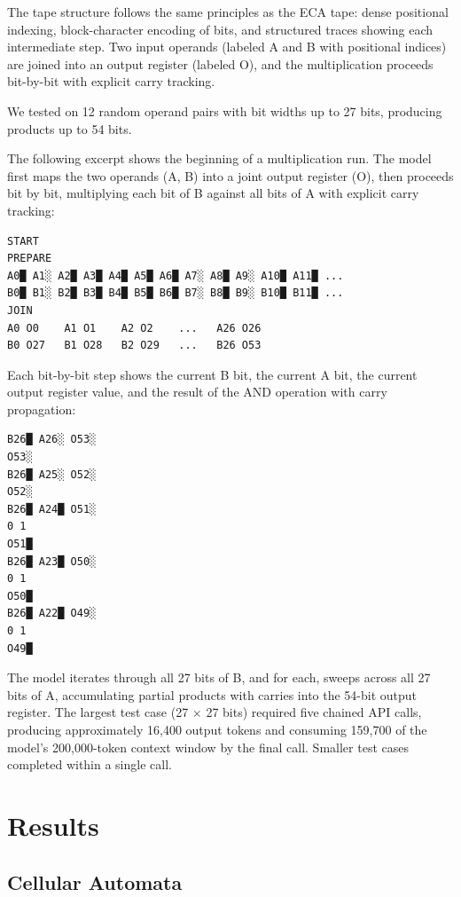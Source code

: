 \documentclass[twocolumn,switch,10pt]{article}
\begin{document}
The tape structure follows the same principles as the ECA tape: dense positional indexing, block-character encoding of bits, and structured traces showing each intermediate step. Two input operands (labeled A and B with positional indices) are joined into an output register (labeled O), and the multiplication proceeds bit-by-bit with explicit carry tracking.

We tested on 12 random operand pairs with bit widths up to 27 bits, producing products up to 54 bits.

The following excerpt shows the beginning of a multiplication run. The model first maps the two operands (A, B) into a joint output register (O), then proceeds bit by bit, multiplying each bit of B against all bits of A with explicit carry tracking:

\begin{verbatim}
START
PREPARE
A0█ A1░ A2█ A3█ A4█ A5█ A6█ A7░ A8█ A9░ A10█ A11█ ...
B0█ B1░ B2█ B3█ B4█ B5█ B6█ B7░ B8█ B9░ B10█ B11█ ...
JOIN
A0 O0    A1 O1    A2 O2    ...   A26 O26
B0 O27   B1 O28   B2 O29   ...   B26 O53
\end{verbatim}

Each bit-by-bit step shows the current B bit, the current A bit, the current output register value, and the result of the AND operation with carry propagation:

\begin{verbatim}
B26█ A26░ O53░
O53░
B26█ A25░ O52░
O52░
B26█ A24█ O51░
0 1
O51█
B26█ A23█ O50░
0 1
O50█
B26█ A22█ O49░
0 1
O49█
\end{verbatim}

The model iterates through all 27 bits of B, and for each, sweeps across all 27 bits of A, accumulating partial products with carries into the 54-bit output register. The largest test case (27 \(\times\) 27 bits) required five chained API calls, producing approximately 16,400 output tokens and consuming 159,700 of the model's 200,000-token context window by the final call. Smaller test cases completed within a single call.

\section{Results}\label{sec:results}

\subsection{Cellular Automata}\label{cellular-automata}
\end{document}
